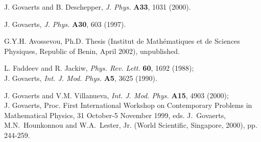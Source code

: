 \documentclass[a4paper,11pt]{article}
\begin{document}
\begin{thebibliography}{99}
J. Govaerts and B. Deschepper, {\em J. Phys.\/} {\bf A33}, 1031 (2000).

J. Govaerts, {\em J. Phys.\/} {\bf A30}, 603 (1997).

G.Y.H. Avossevou, Ph.D. Thesis (Institut de Math\'ematiques
et de Sciences Physiques, Republic of Benin, April 2002), unpublished.

L. Faddeev and R. Jackiw, {\em Phys. Rev. Lett.\/} {\bf 60}, 1692 (1988);\\
J. Govaerts, {\em Int. J. Mod. Phys.\/} {\bf A5}, 3625 (1990).

J. Govaerts and V.M. Villanueva, {\em Int. J. Mod. Phys.\/}
{\bf A15}, 4903 (2000);\\
J. Govaerts, Proc. First International Workshop on Contemporary 
Pro\-blems in Mathematical Physics, 31 October-5 November
1999, eds. J.~Govaerts, M.N.~Hounkonnou and W.A.~Lester, Jr. (World Scientific,
Singapore, 2000), pp. 244-259.

\end{thebibliography}
\end{document}
